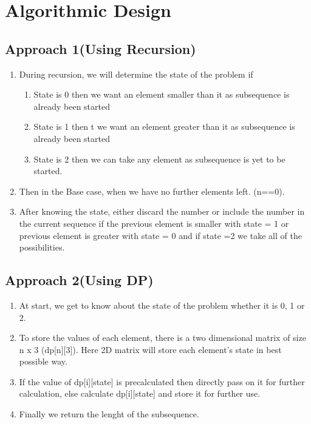 \documentclass[conference]{IEEEtran}
\begin{document}
\section{Algorithmic Design}

\subsection{ \textbf{Approach 1(Using Recursion)}}
\begin{enumerate}
\item During recursion, we will determine the state of the problem if
\begin{enumerate}
\item State is 0 then we want an element smaller than it as subsequence is already been started
\item State is 1 then t we want an element greater than it as subsequence is already been started
\item State is 2 then we can take any element as subsequence is yet to be started.
\end{enumerate}
\item Then in the Base case, when we have no further elements left. (n==0).
\item After knowing the state,  either discard the number or include the number in the current sequence if the previous element is smaller with state = 1 or previous element is greater with state = 0 and if state =2 we take all of the possibilities.
\end{enumerate}


\subsection{ \textbf{Approach 2(Using DP)}}
\begin{enumerate}
\item  At start, we get to know about the state of the problem whether it is 0, 1 or 2.
\item To store the values of each element, there is a  two dimensional matrix of size n x 3 (dp[n][3]). Here 2D matrix will store each element’s state in best possible way.
\item If the value of dp[i][state] is precalculated then directly pass on it for further calculation, else calculate dp[i][state] and store it for further use.
\item Finally we return the lenght of the subsequence.
\end{enumerate}
\end{document}
